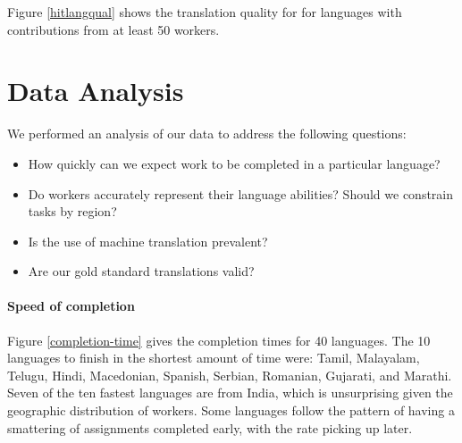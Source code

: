 \documentclass[11pt]{article}
\begin{document}
Figure \ref{hitlangqual} shows the translation quality for for languages with contributions from at least 50 workers.  



\section{Data Analysis}

We performed an analysis of our data to address the following questions:
\begin{itemize}
\item How quickly can we expect work to be completed in a particular language? 
\item Do workers accurately represent their language abilities?  Should we constrain tasks by region? 
\item Is the use of machine translation prevalent?  
\item Are our gold standard translations valid? 
\end{itemize}


\paragraph{Speed of completion}


Figure \ref{completion-time} gives the completion times for 40 languages.  
The 10 languages to finish in the shortest amount of time were: Tamil, Malayalam, Telugu, Hindi, Macedonian, Spanish, Serbian, Romanian, Gujarati, and Marathi. Seven of the ten fastest languages are from India, which is unsurprising given the geographic distribution of workers.  Some languages follow the pattern of having a smattering of assignments completed early, with the rate picking up later. 
\end{document}
